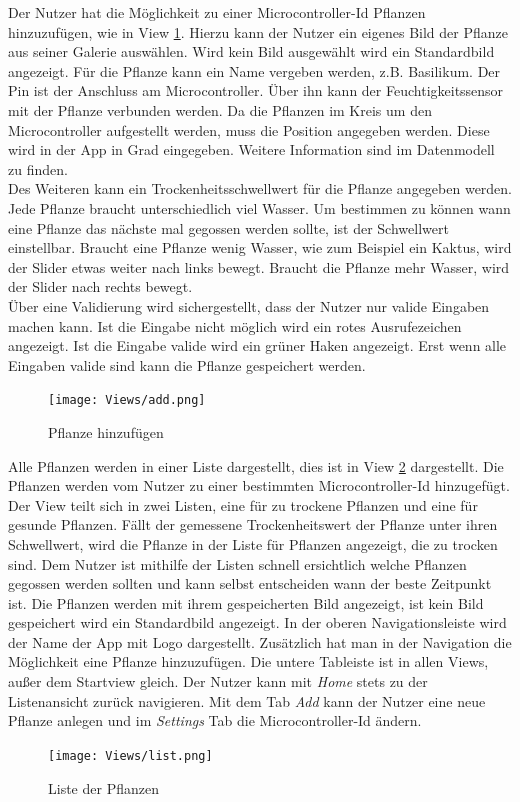 Der Nutzer hat die Möglichkeit zu einer Microcontroller-Id Pflanzen hinzuzufügen, wie in View \ref{add}. Hierzu kann der Nutzer ein eigenes Bild der Pflanze aus seiner Galerie auswählen. Wird kein Bild ausgewählt wird ein Standardbild angezeigt. Für die Pflanze kann ein Name vergeben werden, z.B. Basilikum. Der Pin ist der Anschluss am Microcontroller. Über ihn kann der Feuchtigkeitssensor mit der Pflanze verbunden werden. Da die Pflanzen im Kreis um den Microcontroller aufgestellt werden, muss die Position angegeben werden. Diese wird in der App in Grad eingegeben. Weitere Information sind im Datenmodell zu finden. \\

Des Weiteren kann ein Trockenheitsschwellwert für die Pflanze angegeben werden. Jede Pflanze braucht unterschiedlich viel Wasser. Um bestimmen zu können wann eine Pflanze das nächste mal gegossen werden sollte, ist der Schwellwert einstellbar. Braucht eine Pflanze wenig Wasser, wie zum Beispiel ein Kaktus, wird der Slider etwas weiter nach links bewegt. Braucht die Pflanze mehr Wasser, wird der Slider nach rechts bewegt. \\

Über eine Validierung wird sichergestellt, dass der Nutzer nur valide Eingaben machen kann. Ist die Eingabe nicht möglich wird ein rotes Ausrufezeichen angezeigt. Ist die Eingabe valide wird ein grüner Haken angezeigt. Erst wenn alle Eingaben valide sind kann die Pflanze gespeichert werden. 

\begin{figure}[H]
    \centering
    \texttt{[image: Views/add.png]}
    \caption{Pflanze hinzufügen}
    \label{add}
\end{figure}

Alle Pflanzen werden in einer Liste dargestellt, dies ist in View \ref{list} dargestellt. Die Pflanzen werden vom Nutzer zu einer bestimmten Microcontroller-Id hinzugefügt. Der View teilt sich in zwei Listen, eine für zu trockene Pflanzen und eine für gesunde Pflanzen. Fällt der gemessene Trockenheitswert der Pflanze unter ihren Schwellwert, wird die Pflanze in der Liste für Pflanzen angezeigt, die zu trocken sind. Dem Nutzer ist mithilfe der Listen schnell ersichtlich welche Pflanzen gegossen werden sollten und kann selbst entscheiden wann der beste Zeitpunkt ist. Die Pflanzen werden mit ihrem gespeicherten Bild angezeigt, ist kein Bild gespeichert wird ein Standardbild angezeigt. In der oberen Navigationsleiste wird der Name der App mit Logo dargestellt. Zusätzlich hat man in der Navigation die Möglichkeit eine Pflanze hinzuzufügen. Die untere Tableiste ist in allen Views, außer dem Startview gleich. Der Nutzer kann mit \textit{Home} stets zu der Listenansicht zurück navigieren. Mit dem Tab \textit{Add} kann der Nutzer eine neue Pflanze anlegen und im \textit{Settings} Tab die Microcontroller-Id ändern.
\begin{figure}[H]
    \centering
    \texttt{[image: Views/list.png]}
    \caption{Liste der Pflanzen}
    \label{list}
\end{figure}

